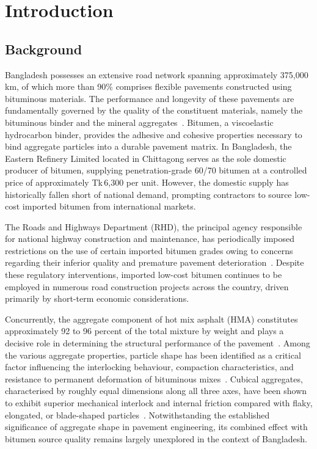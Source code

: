 \documentclass[12pt,a4paper]{article}
\begin{document}
\clearpage
{}
\setcounter{page}{1}
\section{Introduction}

\subsection{Background}

Bangladesh possesses an extensive road network spanning approximately 375,000\,km, of which more than 90\% comprises flexible pavements constructed using bituminous materials. The performance and longevity of these pavements are fundamentally governed by the quality of the constituent materials, namely the bituminous binder and the mineral aggregates~\cite{werkineh2020assessment}. Bitumen, a viscoelastic hydrocarbon binder, provides the adhesive and cohesive properties necessary to bind aggregate particles into a durable pavement matrix. In Bangladesh, the Eastern Refinery Limited located in Chittagong serves as the sole domestic producer of bitumen, supplying penetration-grade 60/70 bitumen at a controlled price of approximately Tk\,6,300 per unit. However, the domestic supply has historically fallen short of national demand, prompting contractors to source low-cost imported bitumen from international markets.

The Roads and Highways Department (RHD), the principal agency responsible for national highway construction and maintenance, has periodically imposed restrictions on the use of certain imported bitumen grades owing to concerns regarding their inferior quality and premature pavement deterioration~\cite{imran2025developing}. Despite these regulatory interventions, imported low-cost bitumen continues to be employed in numerous road construction projects across the country, driven primarily by short-term economic considerations.

Concurrently, the aggregate component of hot mix asphalt (HMA) constitutes approximately 92 to 96 percent of the total mixture by weight and plays a decisive role in determining the structural performance of the pavement~\cite{rajkumar2018experimental}. Among the various aggregate properties, particle shape has been identified as a critical factor influencing the interlocking behaviour, compaction characteristics, and resistance to permanent deformation of bituminous mixes~\cite{teja2020effect}. Cubical aggregates, characterised by roughly equal dimensions along all three axes, have been shown to exhibit superior mechanical interlock and internal friction compared with flaky, elongated, or blade-shaped particles~\cite{sumanth2017study}. Notwithstanding the established significance of aggregate shape in pavement engineering, its combined effect with bitumen source quality remains largely unexplored in the context of Bangladesh.
\end{document}
